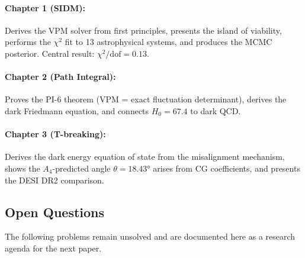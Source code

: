 \documentclass[12pt, a4paper]{article}
\begin{document}
\paragraph{Chapter 1 (SIDM):} Derives the VPM solver from first principles, presents the island of viability, performs the $\chi^2$ fit to 13 astrophysical systems, and produces the MCMC posterior. Central result: $\chi^2/\text{dof} = 0.13$.

\paragraph{Chapter 2 (Path Integral):} Proves the PI-6 theorem (VPM = exact fluctuation determinant), derives the dark Friedmann equation, and connects $H_0 = 67.4$ to dark QCD.

\paragraph{Chapter 3 (T-breaking):} Derives the dark energy equation of state from the misalignment mechanism, shows the $A_4$-predicted angle $\theta = 18.43°$ arises from CG coefficients, and presents the DESI DR2 comparison.

\subsection{Open Questions}

The following problems remain unsolved and are documented here as a research agenda for the next paper.
\end{document}
